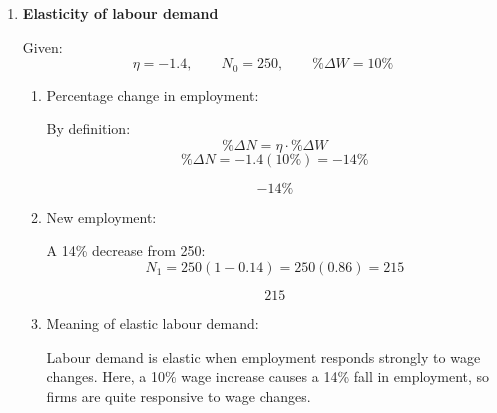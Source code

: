 \documentclass[12pt]{article}
\begin{document}
\begin{enumerate}
\begin{enumerate}[label=(\alph*)]
    Differentiate \(Q\) with respect to \(N\):
    \[
    MP_N=\frac{dQ}{dN}=40-2N
    \]

    \[
    \boxed{MP_N=40-2N}
    \]

    \item Value of marginal product:

    \[
    VMP_N=P\cdot MP_N=3(40-2N)=120-6N
    \]

    \[
    \boxed{VMP_N=120-6N}
    \]

    \item Profit-maximizing employment:

    Competitive firms hire labour until:
    \[
    VMP_N=w
    \]
    So:
    \[
    120-6N=48
    \]
    \[
    72=6N
    \]
    \[
    N=12
    \]

    \[
    \boxed{N=12}
    \]

    \item Total output at \(N=12\):

    \[
    Q=40(12)-12^2=480-144=336
    \]

    \[
    \boxed{Q=336}
    \]
\end{enumerate}


\item \textbf{Elasticity of labour demand}

Given:
\[
\eta=-1.4,\qquad N_0=250,\qquad \%\Delta W=10\%
\]

\begin{enumerate}[label=(\alph*)]
    \item Percentage change in employment:

    By definition:
    \[
    \%\Delta N = \eta \cdot \%\Delta W
    \]
    \[
    \%\Delta N = -1.4(10\%)=-14\%
    \]

    \[
    \boxed{-14\%}
    \]

    \item New employment:

    A 14\% decrease from 250:
    \[
    N_1=250(1-0.14)=250(0.86)=215
    \]

    \[
    \boxed{215}
    \]

    \item Meaning of elastic labour demand:

    Labour demand is elastic when employment responds strongly to wage changes. Here, a 10\% wage increase causes a 14\% fall in employment, so firms are quite responsive to wage changes.
\end{enumerate}


\end{enumerate}
\end{document}
